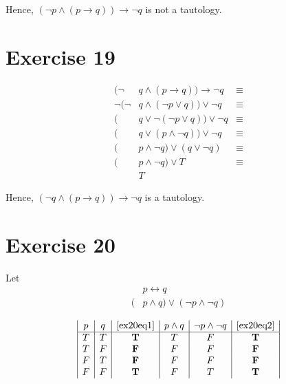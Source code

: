 \documentclass{article}
\let\biconditional\leftrightarrow
\let\conditional\rightarrow
\begin{document}
Hence, $(\neg p \land (p \conditional q)) \conditional \neg q$ is not a tautology.

\pagebreak

\section{Exercise 19}

\begin{align*}
	(\neg      & q \land (p \conditional q)) \conditional \neg q & \equiv \\
	\neg (\neg & q \land (\neg p \lor q)) \lor \neg q            & \equiv \\
	(          & q \lor \neg (\neg p \lor q)) \lor \neg q        & \equiv \\
	(          & q \lor (p \land \neg q)) \lor \neg q            & \equiv \\
	(          & p \land \neg q) \lor (q \lor \neg q)            & \equiv \\
	(          & p \land \neg q) \lor T                          & \equiv \\
	           & T
\end{align*}

Hence, $(\neg q \land (p \conditional q)) \conditional \neg q$ is a tautology.

\pagebreak

\section{Exercise 20}
Let
\begin{align}
	  & p \biconditional q \label{ex20eq1}                    \\
	( & p \land q) \lor (\neg p \land \neg q) \label{ex20eq2}
\end{align}

\[
	\begin{array}{|c|c|c|c|c|c|}
		p & q & \eqref{ex20eq1} & p \land q & \neg p \land \neg q & \eqref{ex20eq2} \\
		\hline
		T & T & \textbf{T}      & T         & F                   & \textbf{T}      \\
		T & F & \textbf{F}      & F         & F                   & \textbf{F}      \\
		F & T & \textbf{F}      & F         & F                   & \textbf{F}      \\
		F & F & \textbf{T}      & F         & T                   & \textbf{T}
	\end{array}
\]
\end{document}
